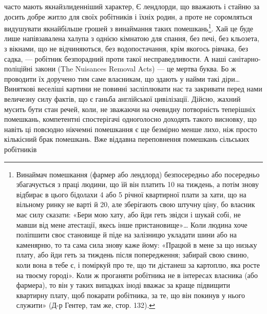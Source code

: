 часто мають якнайзлиденніший характер, Є лендлорди, що вважають
і стайню за досить добре житло для своїх робітників
і їхніх родин, а проте не соромляться видушувати якнайбільше
грошей з винаймання таких помешкань\footnote{
Винаймач помешкання (фармер або лендлорд) безпосередньо або
посередньо збагачується з праці людини, що їй він платить 10
на тиждень, а потім знову відбирає в цього бідолахи 4 або 5 річної квартирної плати за хати, що на вільному ринку не
варті й 20, але зберігають свою штучну ціну, бо власник
має силу сказати: «Бери мою хату, або йди геть звідси і шукай собі,
не мавши від мене атестації, якесь інше пристановище»\dots{} Коли людина
хоче поліпшити своє становище й піде на залізницю укладати шини або
на каменярню, то та сама сила знову каже йому: «Працюй в мене за що
низьку плату, або йди геть за тиждень після попередження; забирай свою
свиню, коли вона в тебе є, і поміркуй про те, що ти дістанеш за картоплю,
яка росте на твоєму городі». Коли ж проганяти робітника не в інтересах
власника (або фармера), то він у таких випадках іноді вважає за краще
підвищити квартирну плату, щоб покарати робітника, за те, що він
покинув у нього служити» (Д-р Гентер, там же, стор. 132).
}. Хай це буде лише
напівзавалена халупа з однією кімнатою для спання, без печі,
без кльозета, з вікнами, що не відчиняються, без водопостачання,
крім якогось рівчака, без садка, — робітник безпорадний проти
такої несправедливости. А наші санітарно-поліційні закони
(The Nuisances Removal Acts) — це мертва буква. Бо ж проводити
їх доручено тим саме власникам, що здають у найми
такі діри\dots{} Виняткові веселіші картини не повинні засліплювати
нас та закривати перед нами величезну силу фактів, що є ганьба
англійської цивілізації. Дійсно, жахний мусить бути стан речей,
коли, не зважаючи на очевидну потворність теперішніх
помешкань, компетентні спостерігачі одноголосно доходять такого
висновку, що навіть ці повсюдно нікчемні помешкання є ще
безмірно менше лихо, ніж просто кількісний брак помешкань.
Вже віддавна переповнення помешкань сільських робітників
\parbreak{}  %
